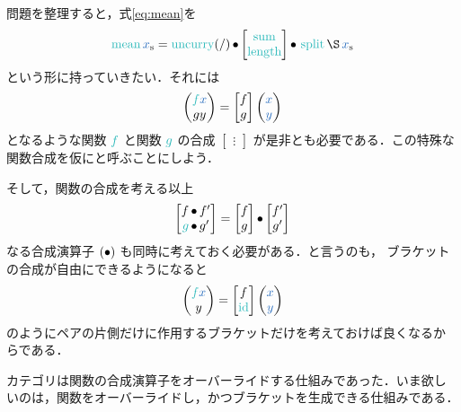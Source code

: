\documentclass[a5paper,twoside,fleqn,draft]{jsbook}
\begin{document}
問題を整理すると，式\eqref{eq:mean}を
\begin{equation}
  \mMean\hListVar{x}
  =\hUncurry(/)
  \hCompose
  \begin{bmatrix}
    \hSum\\
    \mLength
  \end{bmatrix}
  \hCompose{}
  \mSplit
  \hApply
  \hListVar{x}
\end{equation}
という形に持っていきたい．それには
\begin{equation}
  \hPairWith{\hFunc{f}\hVar{x}}{gy}
  =
  \begin{bmatrix}
    f\\
    g
  \end{bmatrix}
  \hPairWith{\hVar{x}}{\hVar{y}}
\end{equation}
となるような関数 $\hFunc{f}$ と関数 $\hFunc{g}$ の合成
$\begin{bmatrix}\vdots\end{bmatrix}$ が是非とも必要である．この特殊な
  関数合成を仮にと呼ぶことにしよう．

そして，関数の合成を考える以上
\begin{equation}
  \begin{bmatrix}
    f\hCompose f'\\
    \hFunc{g}\hCompose g'
  \end{bmatrix}
  =
  \begin{bmatrix}
    f\\
    g
  \end{bmatrix}
  \mCompCat
  \begin{bmatrix}
    f'\\
    g'
  \end{bmatrix}
\end{equation}
なる合成演算子 $(\operatorname{\bullet})$ も同時に考えておく必要がある．と言うのも，
ブラケットの合成が自由にできるようになると
\begin{equation}
  \hPairWith{\hFunc{f}\hVar{x}}{y}
  =
  \begin{bmatrix}
    f\\
    \mId
  \end{bmatrix}
  \hPairWith{\hVar{x}}{\hVar{y}}
\end{equation}
のようにペアの片側だけに作用するブラケットだけを考えておけば良くなるか
らである．

\separator

カテゴリは関数の合成演算子をオーバーライドする仕組みであった．いま欲し
いのは，関数をオーバーライドし，かつブラケットを生成できる仕組みである．
\end{document}
